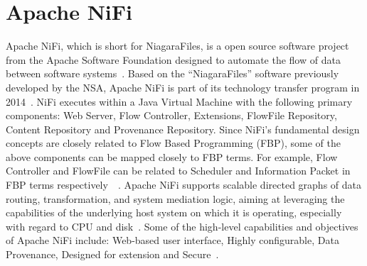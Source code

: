 \section{Apache NiFi}

Apache NiFi, which is short for NiagaraFiles, is a open source
software project from the Apache Software Foundation designed to
automate the flow of data between software
systems~\cite{hid-sp18-405-wiki-nifi}. Based on the ``NiagaraFiles''
software previously developed by the NSA, Apache NiFi is part of its
technology transfer program in 2014~\cite{hid-sp18-405-wiki-nifi}.
NiFi executes within a Java Virtual Machine with the following primary
components: Web Server, Flow Controller, Extensions, FlowFile
Repository, Content Repository and Provenance Repository. Since NiFi's
fundamental design concepts are closely related to Flow Based
Programming (FBP), some of the above components can be mapped closely
to FBP terms. For example, Flow Controller and FlowFile can be related
to Scheduler and Information Packet in FBP terms
respectively~\cite{hid-sp18-405-wwwoverview-nifi}~\cite{hid-sp18-405-wikifbp-nifi}.
Apache NiFi supports scalable directed graphs of data routing,
transformation, and system mediation logic, aiming at leveraging the
capabilities of the underlying host system on which it is operating,
especially with regard to CPU and
disk~\cite{hid-sp18-405-wwwoverview-nifi}. Some of the high-level
capabilities and objectives of Apache NiFi include: Web-based user
interface, Highly configurable, Data Provenance, Designed for
extension and Secure~\cite{hid-sp18-405-www-nifi}.
